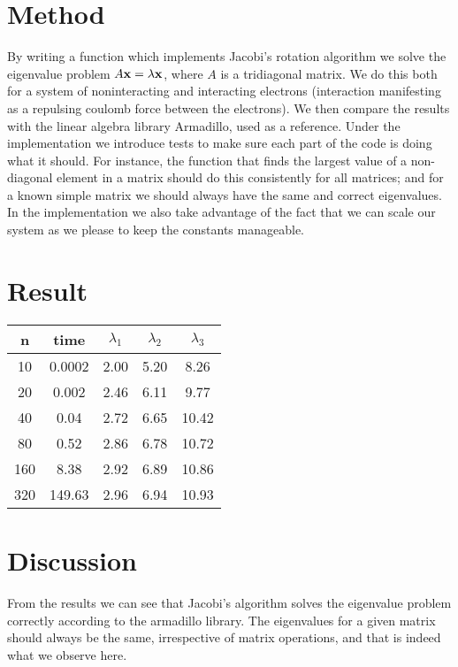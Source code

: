 \section{Method}
	By writing a function which implements Jacobi's rotation algorithm we solve the eigenvalue problem $A\vb{x} = \lambda \vb{x}$, where $A$ is a tridiagonal matrix. We do this both for a system of noninteracting and interacting electrons (interaction manifesting as a repulsing coulomb force between the electrons). We then compare the results with the linear algebra library Armadillo, used as a reference. Under the implementation we introduce tests to make sure each part of the code is doing what it should. For instance, the function that finds the largest value of a non-diagonal element in a matrix should do this consistently for all matrices; and for a known simple matrix we should always have the same and correct eigenvalues. In the implementation we also take advantage of the fact that we can scale our system as we please to keep the constants manageable.
















\section{Result}


\begin{tabular}{|c|c|c|c|c|}
	\hline 
	n & time & $\lambda_1$ & $\lambda_2$ & $\lambda_3$\\ 
	\hline
	10 & 0.0002 & 2.00 & 5.20 & 8.26 \\
	\hline
	20 & 0.002 & 2.46 & 6.11 & 9.77 \\
	\hline
	40 & 0.04 & 2.72 & 6.65 & 10.42 \\
	\hline
	80 & 0.52 & 2.86 & 6.78 & 10.72 \\
	\hline
	160 & 8.38 & 2.92 & 6.89 & 10.86 \\
	\hline
	320 & 149.63 & 2.96 & 6.94 & 10.93 \\
	\hline
\end{tabular}





\section{Discussion}
From the results we can see that Jacobi's algorithm solves the eigenvalue problem correctly according to the armadillo library. The eigenvalues for a given matrix should always be the same, irrespective of matrix operations, and that is indeed what we observe here. 


















